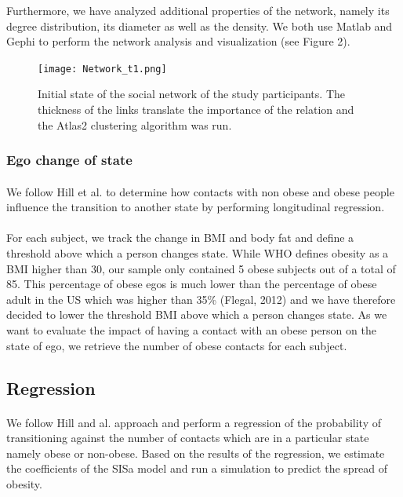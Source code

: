 \documentclass[11pt]{article}
\begin{document}
Furthermore, we have analyzed additional properties of the network, namely its degree distribution, its diameter as well as the density. We both use Matlab and Gephi to perform the network analysis and visualization (see Figure 2).

\begin{figure}[!h]
\center
   \texttt{[image: Network\_t1.png]}
   \caption{\label{4} Initial state of the social network of the study participants. The thickness of the links translate the importance of the relation and the Atlas2 clustering algorithm was run.}
\end{figure}

\subsubsection{Ego change of state}
\paragraph{}
We follow Hill et al. to determine how contacts with non obese and obese people influence the transition to another state by performing longitudinal regression. 
\paragraph{}
For each subject, we track the change in BMI and body fat and define a threshold above which a person changes state. While WHO defines obesity as a BMI higher than 30, our sample only contained 5 obese subjects out of a total of 85. This percentage of obese egos is much lower than the percentage of obese adult in the US which was higher than 35\% (Flegal, 2012) and we have therefore decided to lower the threshold BMI above which a person changes state. As we want to evaluate the impact of having a contact with an obese person  on the state of ego, we retrieve the number of obese contacts for each subject.

\subsection{Regression}
\paragraph{}
We follow Hill and al. approach and perform a regression of the probability of transitioning against the number of contacts which are in a particular state namely obese or non-obese. Based on the results of the regression, we estimate the coefficients of the SISa model and run a simulation to predict the spread of obesity.
\end{document}
